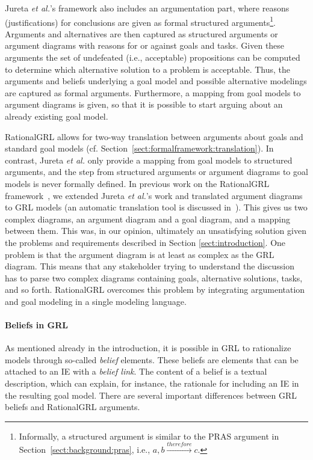 Jureta \emph{et al.}'s framework also includes an argumentation part, where reasons (justifications) for conclusions are given as formal structured arguments\footnote{Informally, a structured argument is similar to the PRAS argument in Section~\ref{sect:background:pras}, i.e., $a, b \xrightarrow{therefore} c$.}. Arguments and alternatives are then captured as structured arguments or argument diagrams with reasons for or against goals and tasks. Given these arguments the set of undefeated (i.e., acceptable) propositions can be computed to determine which alternative solution to a problem is acceptable. Thus, the arguments and beliefs underlying a goal model and possible alternative modelings are captured as formal arguments. Furthermore, a mapping from goal models to argument diagrams is given, so that it is possible to start arguing about an already existing goal model.

RationalGRL allows for two-way translation between arguments about goals and standard goal models (cf. Section~\ref{sect:formalframework:translation}). In contrast, Jureta \emph{et al.} only provide a mapping from goal models to structured arguments, and the step from structured arguments or argument diagrams to goal models is never formally defined. In previous work on the RationalGRL framework~\cite{vanzee-etal:renext2015,vanZee-etal:er2016}, we extended Jureta \emph{et al.}'s work and translated argument diagrams to GRL models (an automatic translation tool is discussed in~\cite{vanZee-etal:er2016}). This gives us two complex diagrams, an argument diagram and a goal diagram, and a mapping between them. This was, in our opinion, ultimately an unsatisfying solution given the problems and requirements described in Section \ref{sect:introduction}. One problem is that the argument diagram is at least as complex as the GRL diagram. This means that any stakeholder trying to understand the discussion has to parse two complex diagrams containing goals, alternative solutions, tasks, and so forth. RationalGRL overcomes this problem by integrating argumentation and goal modeling in a single modeling language.

\paragraph{Beliefs in GRL} As mentioned already in the introduction, it is possible in GRL to rationalize models
through so-called \emph{belief} elements. These beliefs are elements that can be attached to an IE with a \emph{belief link}. The content of a belief is a textual description, which can explain, for instance, the rationale for including an IE in the resulting goal model. There are several important differences between GRL beliefs and RationalGRL arguments.

